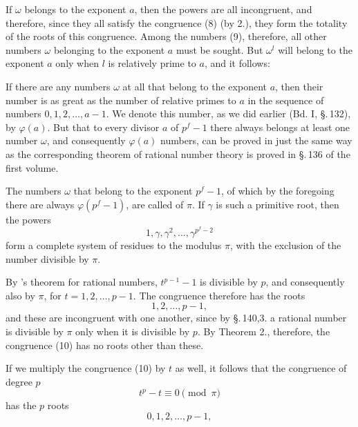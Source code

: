 If $\omega$ belongs to the exponent $a$, then the powers
are all incongruent, and therefore, since they all satisfy the congruence (8) (by 2.), they form the totality of the roots of this congruence. Among the numbers (9), therefore, all other numbers $\omega$ belonging to the exponent $a$ must be sought. But $\omega^l$ will belong to the exponent $a$ only when $l$ is relatively prime to $a$, and it follows:

If there are any numbers $\omega$ at all that belong to the exponent $a$, then their number is as great as the number of relative primes to $a$ in the sequence of numbers $0, 1, 2, \ldots, a-1$. We denote this number, as we did earlier (Bd. I, \S.\,132), by $\varphi(a)$. But that to every divisor $a$ of $p^f-1$ there always belongs at least one number $\omega$, and consequently $\varphi(a)$ numbers, can be proved in just the same way as the corresponding theorem of rational number theory is proved in \S.\,136 of the first volume.

The numbers $\omega$ that belong to the exponent $p^f-1$, of which by the foregoing there are always $\varphi(p^f-1)$, are called  of $\pi$. If $\gamma$ is such a primitive root, then the powers
\[ 1, \gamma, \gamma^2, \ldots, \gamma^{p^f-2} \]
form a complete system of residues to the modulus $\pi$, with the exclusion of the number divisible by $\pi$.

By 's theorem for rational numbers, $t^{p-1}-1$ is divisible by $p$, and consequently also by $\pi$, for $t = 1, 2, \ldots, p-1$. The congruence
therefore has the roots
\[ 1, 2, \ldots, p-1, \]
and these are incongruent with one another, since by \S.\,140,3. a rational number is divisible by $\pi$ only when it is divisible by $p$. By Theorem 2., therefore, the congruence (10) has no roots other than these.

If we multiply the congruence (10) by $t$ as well, it follows that the congruence of degree $p$
\[ t^p - t \equiv 0 \pmod{\pi} \]
has the $p$ roots
\[ 0, 1, 2, \ldots, p-1, \]
